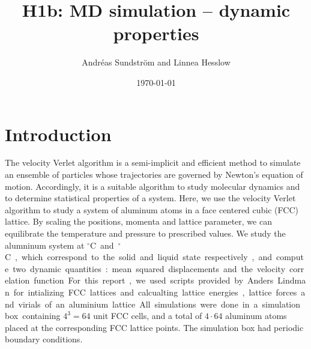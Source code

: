 
\usepackage{units}
\usepackage{physics}

\newcommand{\ee}{\mathrm{e}}
\newcommand{\ii}{\mathrm{i}}

\title{H1b: MD simulation -- dynamic properties}
\author{Andr\'eas Sundstr\"om and Linnea Hesslow}
\date{\today}





\section*{Introduction}

The velocity Verlet algorithm is a semi-implicit and efficient method to simulate an ensemble of particles whose trajectories are governed by Newton's equation of motion. Accordingly, it is a suitable algorithm to study molecular dynamics and to determine statistical properties of a system. Here, we use the velocity Verlet algorithm to study a system of aluminum atoms in a face centered cubic (FCC) lattice. By scaling the positions, momenta and lattice parameter, we can equilibrate the temperature and pressure to prescribed values. We  study the alumninum system at \unit[500]{$^\circ$C} and \unit[700]{$^\circ$C}, which correspond to the solid and liquid state respectively, and compute two dynamic quantities:   
mean squared displacements and the velocity correlation function.

For this report, we used scripts provided by Anders Lindman for intializing FCC lattices and calcualting lattice energies, lattice forces and virials of an aluminium lattice. All simulations were done in a simulation box containing $4^3=64$ unit FCC cells, and a total of $4\cdot64$ aluminum atoms placed at the corresponding FCC lattice points. The simulation box had periodic boundary conditions.

